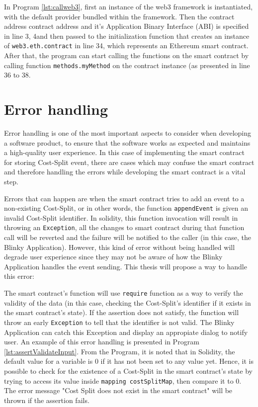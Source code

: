 \documentclass[twoside,numperchapter]{tutthesis} %
\begin{document}
In Program \ref{lst:callweb3}, first an instance of the web3 framework is instantiated, with the default provider bundled within the framework. Then the contract address contract address and it's Application Binary Interface (ABI) is specified in line 3, 4and then passed to the initialization function that creates an instance of \texttt{web3.eth.contract} in line 34, which represents an Ethereum smart contract. After that, the program can start calling the functions on the smart contract by calling function \texttt{methods.myMethod} on the contract instance (as presented in line 36 to 38.

\section{Error handling}

Error handling is one of the most important aspects to consider when developing a software product, to ensure that the software works as expected and maintains a high-quality user experience. In this case of implementing the smart contract for storing Cost-Split event, there are cases which may confuse the smart contract and therefore handling the errors while developing the smart contract is a vital step.

Errors that can happen are when the smart contract tries to add an event to a non-existing Cost-Split, or in other words, the function \texttt{appendEvent} is given an invalid Cost-Split identifier. In solidity, this function invocation will result in throwing an \texttt{Exception}, all the changes to smart contract during that function call will be reverted and the failure will be notified to the caller (in this case, the Blinky Application). However, this kind of error without being handled will degrade user experience since they may not be aware of how the Blinky Application handles the event sending. This thesis will propose a way to handle this error:

 The smart contract's function will use \texttt{require} function as a way to verify the validity of the data (in this case, checking the Cost-Split's identifier if it exists in the smart contract's state). If the assertion does not satisfy, the function will throw an early \texttt{Exception} to tell that the identifier is not valid. The Blinky Application can catch this Exception and display an appropiate dialog to notify user. An example of this error handling is presented in Program \ref{lst:assertValidateInput}. From the Program, it is noted that in Solidity, the default value for a variable is 0 if it has not been set to any value yet. Hence, it is possible to check for the existence of a Cost-Split in the smart contract's state by trying to access its value inside \texttt{mapping costSplitMap}, then compare it to 0. The error message "Cost Split does not exist in the smart contract" will be thrown if the assertion fails.
\end{document}
